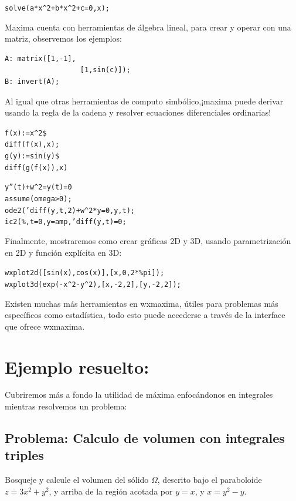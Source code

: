 \documentclass[a4paper]{article}
\begin{document}
\begin{alltt}
solve(a*x^2 + b*x^2 + c = 0,x);
\end{alltt}

Maxima cuenta con herramientas de álgebra lineal, para crear y operar con una matriz, observemos los ejemplos:

\begin{verbatim}
A: matrix([1,-1],
		          [1,sin(c)]);
B: invert(A);
\end{verbatim}

Al igual que otras herramientas de computo simbólico,¡maxima puede derivar usando la regla de la cadena y resolver ecuaciones diferenciales ordinarias!

\begin{alltt}
f(x) := x^2 \$
diff(f(x),x);
g(y) := sin(y) \$
diff( g(f(x)) , x)
\end{alltt}


\begin{alltt}
y''(t) + w^2 = y(t) = 0
assume(omega >0);
ode2('diff(y,t,2) + w^2 * y = 0, y, t );
ic2(\%, t=0, y=amp, 'diff(y,t) = 0;
\end{alltt}

Finalmente, mostraremos como crear gráficas 2D y 3D, usando parametrización en 2D y función explícita en 3D:

\begin{alltt}
wxplot2d([sin(x), cos(x)], [x,0,2*\% pi]);
wxplot3d( exp(-x^2 - y^2), [x,-2,2],[y,-2,2]);
\end{alltt}

Existen muchas más herramientas en wxmaxima, útiles para problemas más específicos como estadística, todo esto puede accederse a través de la interface que ofrece wxmaxima.


\section{Ejemplo resuelto: }

Cubriremos más a fondo la utilidad de máxima enfocándonos en integrales mientras resolvemos un problema:

\subsection{Problema: Calculo de volumen con integrales triples}

Bosqueje y calcule el volumen del sólido $\Omega$, descrito bajo el paraboloide $z = 3x^2 +y^2$, y arriba de la región acotada por $y=x$, y $x=y^2 - y$.
\end{document}
